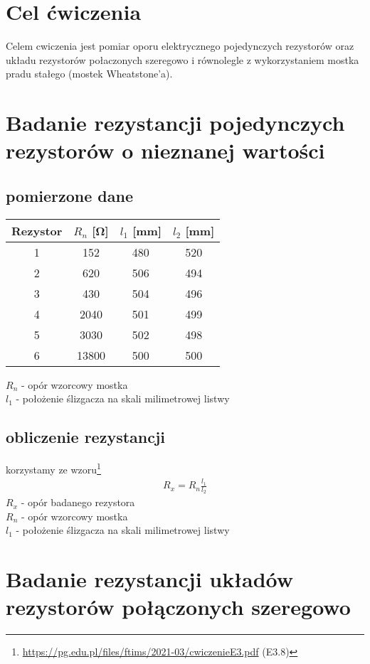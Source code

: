 \documentclass{article}
\begin{document}
\section{Cel ćwiczenia}
Celem cwiczenia jest pomiar oporu elektrycznego pojedynczych rezystorów
oraz układu rezystorów połaczonych szeregowo i równolegle z wykorzystaniem
mostka pradu stałego (mostek Wheatstone’a).

\section{Badanie rezystancji pojedynczych rezystorów o nieznanej wartości}
\subsection{pomierzone dane}
\begin{center}
\begin{tabular}{ c | c | c | c}
Rezystor & $R_n$ [\si{\ohm}] & $l_1$ [mm] & $l_2$ [mm]\\
\hline
 1    & 152 & 480 & 520\\ 
 2    & 620 & 506 & 494\\ 
 3  & 430 & 504 & 496\\ 
 4  & 2040 & 501 & 499\\
 5   & 3030 & 502 & 498\\
 6  & 13800 & 500 & 500\\
 
\end{tabular}
\end{center}
$R_n$ - opór wzorcowy mostka\\ 
$l_1$ - położenie ślizgacza na skali milimetrowej listwy\\

\subsection{obliczenie rezystancji}
korzystamy ze wzoru\footnote{\url{https://pg.edu.pl/files/ftims/2021-03/cwiczenieE3.pdf} (E3.8)}
\begin{gather*}
	R_x = R_n\frac{l_1}{l_2}
\end{gather*} 
$R_x$ - opór badanego rezystora\\ 
$R_n$ - opór wzorcowy mostka\\ 
$l_1$ - położenie ślizgacza na skali milimetrowej listwy\\




\section{Badanie rezystancji układów rezystorów połączonych szeregowo}
\end{document}
